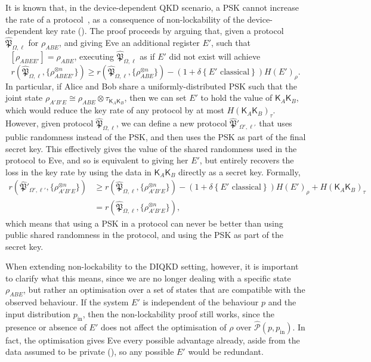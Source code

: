 \documentclass[10pt, a4paper]{article}
\numberwithin{equation}{section} %
\theoremstyle{definition}
\theoremstyle{plain}
\newcommand{\?}{\mathrel{?}} %
\newcommand{\indic}[1]{\delta{\left\{#1\right\}}} %
\newcommand{\Tr}[2][]{\mathop{\mathrm{Tr}#1}\left[ #2 \right]} %
\newcommand{\crv}[1]{\mathsf{#1}}
\newcommand{\compatstates}[3][]{\hat{\mathcal{P}}#1(#2,#3)}
\newcommand{\qproto}[2][_{\Omega,\ell}]{\hat{\mathfrak{#2}}#1}
\newcommand{\prin}[1][p]{#1_{\mathrm{in}}}
\begin{document}
    It is known that, in the device-dependent QKD scenario, a PSK cannot increase the rate of a protocol~\cite[Cor. 5.3]{CQKeyDistill}, as a consequence of non-lockability of the device-dependent key rate (). The proof proceeds by arguing that, given a protocol \(\qproto{P}\) for \(\rho_{ABE}\), and giving Eve an additional register \(E'\), such that \(\Tr[_{E'}]{\rho_{ABEE'}} = \rho_{ABE}\), executing \(\qproto{P}\) as if \(E'\) did not exist will achieve
              \begin{equation}
                r\left(\qproto{P}, {\{\rho_{ABEE'}^{\otimes n}\}} \right) \geq r\left(\qproto{P}, {\{\rho_{ABE}^{\otimes n}\}} \right) - (1+\indic{E' \text{ classical}})H{(E')}_{\rho}.
              \end{equation}
            In particular, if Alice and Bob share a uniformly-distributed PSK such that the joint state \(\rho_{A'B'E} \cong \rho_{ABE} \otimes \tau_{\crv{K}_{A} \crv{K}_{B}}\), then we can set \(E'\) to hold the value of \(\crv{K}_{A} \crv{K}_{B}\), which would reduce the key rate of any protocol by at most \(H{(\crv{K}_{A} \crv{K}_{B})}_{\tau}\). However, given protocol \(\qproto{P}\), we can define a new protocol \(\qproto['_{\Omega',\ell'}]{P}\) that uses public randomness instead of the PSK, and then uses the PSK as part of the final secret key. This effectively gives the value of the shared randomness used in the protocol to Eve, and so is equivalent to giving her \(E'\), but entirely recovers the loss in the key rate by using the data in \(\crv{K}_{A} \crv{K}_{B}\) directly as a secret key. Formally,
              \begin{align}
                r\left(\qproto['_{\Omega',\ell'}]{P}, {\{\rho_{A'B'E}^{\otimes n}\}} \right) &\geq r\left(\qproto{P}, {\{\rho_{A'B'E}^{\otimes n}\}} \right) - (1+\indic{E' \text{ classical}})H{(E')}_{\rho} + H{(\crv{K}_{A} \crv{K}_{B})}_{\tau} \\
                                                                                                      &= r\left(\qproto{P}, {\{\rho_{A'B'E}^{\otimes n}\}} \right),
              \end{align}
              which means that using a PSK in a protocol can never be better than using public shared randomness in the protocol, and using the PSK as part of the secret key.

            When extending non-lockability to the DIQKD setting, however, it is important to clarify what this means, since we are no longer dealing with a specific state \(\rho_{ABE}\), but rather an optimisation over a set of states that are compatible with the observed behaviour. If the system \(E'\) is independent of the behaviour \(p\) and the input distribution \(\prin\), then the non-lockability proof still works, since the presence or absence of \(E'\) does not affect the optimisation of \(\rho\) over \(\compatstates{p}{\prin}\). In fact, the optimisation gives Eve every possible advantage already, aside from the data assumed to be private (), so any possible \(E'\) would be redundant.
\end{document}
